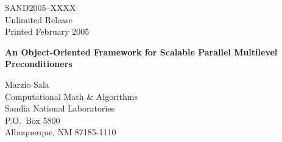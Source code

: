 \documentclass{article}[11pt]
\def\draft{%
\special{!userdict begin /bop-hook{gsave
200 30 translate 65 rotate
/Times-Roman findfont 216 scalefont setfont
0 0 moveto 0.9 setgray (DRAFT) show grestore}def end}
}
\begin{document}

\setcounter{page}{3}

\large


%
%
\begin{center}
SAND2005--XXXX \\
Unlimited Release \\
Printed February 2005
\end{center}

\vspace{0.2in}

\begin{center}
{\Large {\bf An Object-Oriented Framework 
  for Scalable Parallel Multilevel Preconditioners}}

\vspace*{0.8in}
Marzio  Sala \\
Computational Math \& Algorithms \\
Sandia National Laboratories\\
P.O.~Box 5800 \\
Albuquerque, NM 87185-1110
\vspace*{1in}

\end{center}
\end{document}
